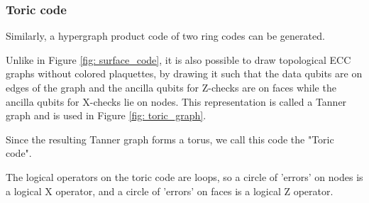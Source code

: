 \subsubsection{Toric code}
Similarly, a hypergraph product code of two ring codes can be 
generated. 

Unlike in Figure \ref{fig: surface_code}, it is also possible to draw topological
ECC graphs without colored plaquettes, by drawing it such that the data qubits are on 
edges of the graph and the ancilla qubits for Z-checks are on faces
while the ancilla qubits for X-checks lie on nodes.
This representation is called a Tanner graph \cite{tillichzemor}
and is used in Figure \ref{fig: toric_graph}.

Since the resulting Tanner graph forms a torus,
we call this code the "Toric code".

The logical operators on the toric code are loops, so a circle of 
'errors' on nodes is a logical X operator, and a circle of 'errors'
on faces is a logical Z operator.

